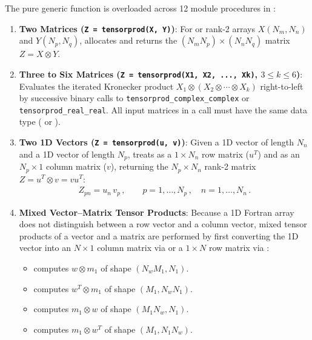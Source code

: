 The pure generic function  is overloaded across 12 module procedures in :
\begin{enumerate}
  \item \textbf{Two Matrices (\texttt{Z = tensorprod(X, Y)})}: For  or  rank-2 arrays $X(N_m,N_n)$ and $Y(N_p,N_q)$, allocates and returns the $(N_m N_p)\times (N_n N_q)$ matrix $Z = X \otimes Y$.
  \item \textbf{Three to Six Matrices (\texttt{Z = tensorprod(X1, X2, ..., Xk)}, $3 \le k \le 6$)}: Evaluates the iterated Kronecker product $X_1 \otimes (X_2 \otimes \cdots \otimes X_k)$ right-to-left by successive binary calls to \texttt{tensorprod\_complex\_complex} or \texttt{tensorprod\_real\_real}. All input matrices in a call must have the same data type ( or ).
  \item \textbf{Two 1D Vectors (\texttt{Z = tensorprod(u, v)})}: Given a 1D vector  of length $N_n$ and a 1D vector  of length $N_p$, treats  as a $1\times N_n$ row matrix ($u^T$) and  as an $N_p\times 1$ column matrix ($v$), returning the $N_p\times N_n$ rank-2 matrix $Z = u^T \otimes v = v u^T$:
  \begin{align}
    Z_{pn} = u_n\, v_p\, , \qquad p = 1,\ldots,N_p\, , \quad n = 1,\ldots,N_n\, .
  \end{align}
  \item \textbf{Mixed Vector--Matrix Tensor Products}: Because a 1D Fortran array does not distinguish between a row vector and a column vector, mixed tensor products of a vector and a matrix are performed by first converting the 1D vector into an $N\times 1$ column matrix via  or a $1\times N$ row matrix via :
  \begin{itemize}
    \item {} computes $w \otimes m_1$ of shape $(N_w M_1, N_1)$.
    \item {} computes $w^T \otimes m_1$ of shape $(M_1, N_w N_1)$.
    \item {} computes $m_1 \otimes w$ of shape $(M_1 N_w, N_1)$.
    \item {} computes $m_1 \otimes w^T$ of shape $(M_1, N_1 N_w)$.
  \end{itemize}
\end{enumerate}

